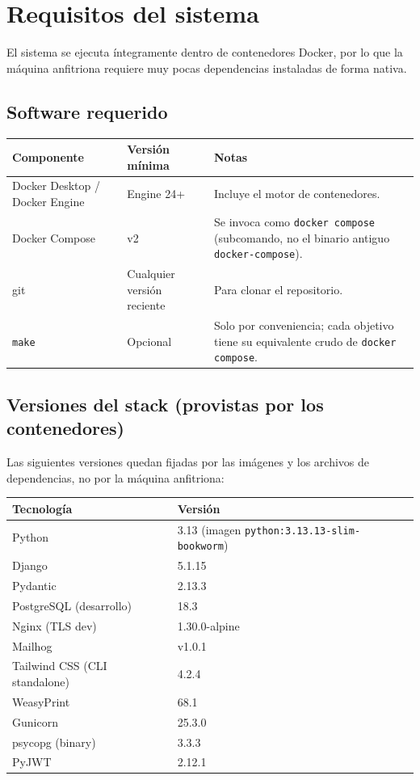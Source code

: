 \documentclass[12pt,letterpaper]{report}
\begin{document}
\chapter{Requisitos del sistema}

El sistema se ejecuta íntegramente dentro de contenedores Docker, por lo que la
máquina anfitriona requiere muy pocas dependencias instaladas de forma nativa.

\section{Software requerido}

\begin{longtable}{L{5.5cm} L{4cm} L{4.5cm}}
\toprule
\textbf{Componente} & \textbf{Versión mínima} & \textbf{Notas} \\
\midrule
\endhead
Docker Desktop / Docker Engine & Engine 24+ & Incluye el motor de contenedores. \\
Docker Compose & v2 & Se invoca como \texttt{docker compose} (subcomando, no el binario antiguo \texttt{docker-compose}). \\
git & Cualquier versión reciente & Para clonar el repositorio. \\
\texttt{make} & Opcional & Solo por conveniencia; cada objetivo tiene su equivalente crudo de \texttt{docker compose}. \\
\bottomrule
\end{longtable}

\section{Versiones del stack (provistas por los contenedores)}

Las siguientes versiones quedan fijadas por las imágenes y los archivos de
dependencias, no por la máquina anfitriona:

\begin{longtable}{L{6cm} L{4.5cm}}
\toprule
\textbf{Tecnología} & \textbf{Versión} \\
\midrule
\endhead
Python & 3.13 (imagen \texttt{python:3.13.13-slim-bookworm}) \\
Django & 5.1.15 \\
Pydantic & 2.13.3 \\
PostgreSQL (desarrollo) & 18.3 \\
Nginx (TLS dev) & 1.30.0-alpine \\
Mailhog & v1.0.1 \\
Tailwind CSS (CLI standalone) & 4.2.4 \\
WeasyPrint & 68.1 \\
Gunicorn & 25.3.0 \\
psycopg (binary) & 3.3.3 \\
PyJWT & 2.12.1 \\
\bottomrule
\end{longtable}
\end{document}
